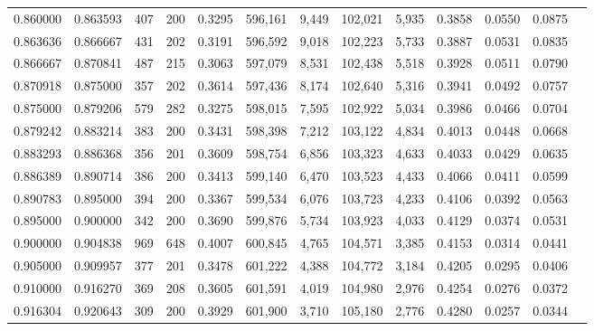 \begin{tabular}{rrrrrrrrrrrrr}
0.860000 & 0.863593 &    407 &   200 &                                     0.3295 & 596,161 &   9,449 & 102,021 &   5,935 & 0.3858 & 0.0550 & 0.0875 \\
0.863636 & 0.866667 &    431 &   202 &                                     0.3191 & 596,592 &   9,018 & 102,223 &   5,733 & 0.3887 & 0.0531 & 0.0835 \\
0.866667 & 0.870841 &    487 &   215 &                                     0.3063 & 597,079 &   8,531 & 102,438 &   5,518 & 0.3928 & 0.0511 & 0.0790 \\
0.870918 & 0.875000 &    357 &   202 &                                     0.3614 & 597,436 &   8,174 & 102,640 &   5,316 & 0.3941 & 0.0492 & 0.0757 \\
0.875000 & 0.879206 &    579 &   282 &                                     0.3275 & 598,015 &   7,595 & 102,922 &   5,034 & 0.3986 & 0.0466 & 0.0704 \\
0.879242 & 0.883214 &    383 &   200 &                                     0.3431 & 598,398 &   7,212 & 103,122 &   4,834 & 0.4013 & 0.0448 & 0.0668 \\
0.883293 & 0.886368 &    356 &   201 &                                     0.3609 & 598,754 &   6,856 & 103,323 &   4,633 & 0.4033 & 0.0429 & 0.0635 \\
0.886389 & 0.890714 &    386 &   200 &                                     0.3413 & 599,140 &   6,470 & 103,523 &   4,433 & 0.4066 & 0.0411 & 0.0599 \\
0.890783 & 0.895000 &    394 &   200 &                                     0.3367 & 599,534 &   6,076 & 103,723 &   4,233 & 0.4106 & 0.0392 & 0.0563 \\
0.895000 & 0.900000 &    342 &   200 &                                     0.3690 & 599,876 &   5,734 & 103,923 &   4,033 & 0.4129 & 0.0374 & 0.0531 \\
0.900000 & 0.904838 &    969 &   648 &                                     0.4007 & 600,845 &   4,765 & 104,571 &   3,385 & 0.4153 & 0.0314 & 0.0441 \\
0.905000 & 0.909957 &    377 &   201 &                                     0.3478 & 601,222 &   4,388 & 104,772 &   3,184 & 0.4205 & 0.0295 & 0.0406 \\
0.910000 & 0.916270 &    369 &   208 &                                     0.3605 & 601,591 &   4,019 & 104,980 &   2,976 & 0.4254 & 0.0276 & 0.0372 \\
0.916304 & 0.920643 &    309 &   200 &                                     0.3929 & 601,900 &   3,710 & 105,180 &   2,776 & 0.4280 & 0.0257 & 0.0344 \\

\end{tabular}
